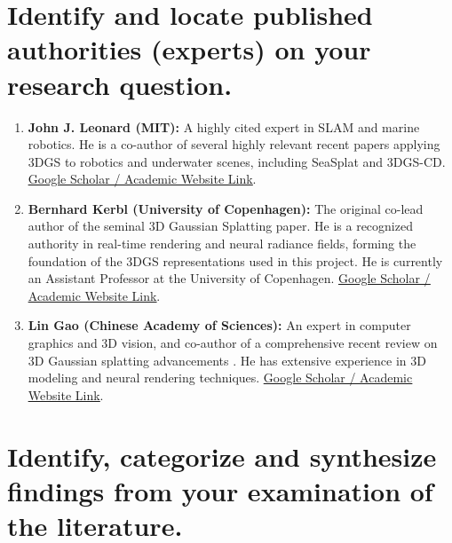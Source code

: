 \documentclass[12pt, a4paper]{article}
\begin{document}
\section*{Identify and locate published authorities (experts) on your research question.}


\begin{enumerate}
    \item \textbf{John J. Leonard (MIT):} A highly cited expert in SLAM and marine robotics. He is a co-author of several highly relevant recent papers applying 3DGS to robotics and underwater scenes, including SeaSplat and 3DGS-CD. \href{https://scholar.google.com/citations?user=WPe7vWwAAAAJ&hl=en}{\underline{Google Scholar / Academic Website Link}}.
    \vspace{0.2cm}
    \item \textbf{Bernhard Kerbl (University of Copenhagen):} The original co-lead author of the seminal 3D Gaussian Splatting paper. He is a recognized authority in real-time rendering and neural radiance fields, forming the foundation of the 3DGS representations used in this project. He is currently an Assistant Professor at the University of Copenhagen. \href{https://scholar.google.com/citations?user=jeasMB0AAAAJ&hl=en}{\underline{Google Scholar / Academic Website Link}}.
    \vspace{0.2cm}
    \item \textbf{Lin Gao (Chinese Academy of Sciences):} An expert in computer graphics and 3D vision, and co-author of a comprehensive recent review on 3D Gaussian splatting advancements \cite{10897713}. He has extensive experience in 3D modeling and neural rendering techniques. \href{https://scholar.google.com/citations?user=_RIupXUAAAAJ&hl=zh-CN}{\underline{Google Scholar / Academic Website Link}}.
\end{enumerate}

\section*{Identify, categorize and synthesize findings from your examination of the literature.}
\end{document}
